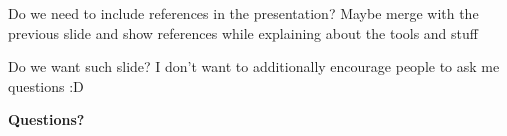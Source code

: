 \documentclass[
paper=128mm:96mm, %
fontsize=11pt, %
pagesize, %
parskip=half-, %
]{scrartcl} %
\theoremstyle{mythmstyle} %
\begin{document}
\begin{comment}
An example of the \texttt{\textbackslash cite} command to cite within the presentation:

This statement requires citation \cite{Smith:2012qr}.
\end{comment}



\clearpage


\thispagestyle{empty} %

Do we need to include references in the presentation? Maybe merge with the previous slide and show references while explaining about the tools and stuff





\clearpage


\thispagestyle{empty} %

Do we want such slide? I don't want to additionally encourage people to ask me questions :D

\begin{flushright}
\vspace{0.6cm}
\color{white}\sffamily
{\bfseries\LARGE Questions?\par} %
\vfill
\end{flushright}

\end{document}
